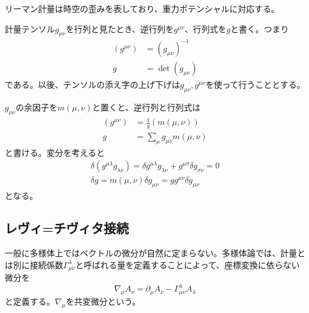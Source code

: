     リーマン計量は時空の歪みを表しており、重力ポテンシャルに対応する。

    計量テンソル$g_{\mu\nu}$を行列と見たとき、逆行列を$g^{\mu\nu}$、行列式を$g$と書く。つまり
    \begin{align*}
        (g^{\mu\nu}) &= (g_{\mu\nu})^{-1}\\
        g &= \det(g_{\mu\nu})
    \end{align*}
    である。以後、テンソルの添え字の上げ下げは$g_{\mu\nu}, g^{\mu\nu}$を使って行うこととする。

    $g_{\mu\nu}$の余因子を$m(\mu, \nu)$と置くと、逆行列と行列式は
    \begin{align*}
        (g^{\mu\nu}) &= \frac{1}{g}(m(\mu, \nu))\\
        g &= \sum_{\mu} g_{\mu\nu}m(\mu, \nu)
    \end{align*}
    と書ける。変分を考えると
    \begin{gather*}
        \delta(g^{\mu\lambda}g_{\lambda\nu}) = \delta g^{\mu\lambda} g_{\lambda\nu} + g^{\mu\sigma} \delta g_{\sigma\nu} = 0\\
        \delta g = m(\mu, \nu) \delta g_{\mu\nu} = g g^{\mu\nu} \delta g_{\mu\nu}
    \end{gather*}
    となる。

\subsection{レヴィ=チヴィタ接続}
    一般に多様体上ではベクトルの微分が自然に定まらない。多様体論では、計量とは別に接続係数$\Gamma^\lambda_{\mu\nu}$と呼ばれる量を定義することによって、座標変換に依らない微分を
        \[\nabla_\mu A_\nu = \partial_\mu A_\nu - \Gamma^\lambda_{\mu\nu} A_\lambda\]
    と定義する。$\nabla_\mu$を共変微分という。
    

